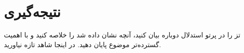 \section{نتیجه‌گیری}

تز را در پرتو استدلال دوباره بیان کنید، آنچه نشان داده شد را خلاصه کنید و با اهمیت گسترده‌تر موضوع پایان دهید.
در اینجا شاهد تازه نیاورید.
